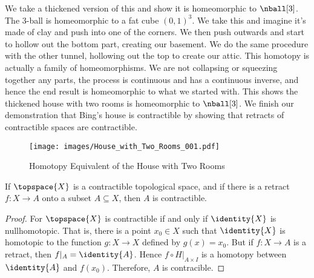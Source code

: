 \documentclass{book}                                                           %
\begin{document}
                We take a thickened version of this and show it is homeomorphic
                to $\nball[3]$. The 3-ball is homeomorphic to a fat cube
                $(0,1)^{3}$. We take this and imagine it's made of clay and push
                into one of the corners. We then push outwards and start to
                hollow out the bottom part, creating our basement. We do the
                same procedure with the other tunnel, hollowing out the top to
                create our attic. This homotopy is actually a family of
                homeomorphisms. We are not collapsing or squeezing together any
                parts, the process is continuous and has a continuous inverse,
                and hence the end result is homeomorphic to what we started
                with. This shows the thickened house with two rooms is
                homeomorphic to $\nball[3]$. We finish our demonstration that
                Bing's house is contractible by showing that retracts of
                contractible spaces are contractible.
                \begin{figure}
                    \centering
                    \captionsetup{type=figure}
                    \texttt{[image: images/House\_with\_Two\_Rooms\_001.pdf]}
                    \caption{Homotopy Equivalent of the House with Two Rooms}
                    \label{fig:House_with_Two_Rooms_001}
                \end{figure}
                \begin{theorem}
                    If $\topspace{X}$ is a contractible topological space, and
                    if there is a retract $f:X\rightarrow{A}$ onto a subset
                    $A\subseteq{X}$, then $A$ is contractible.
                \end{theorem}
                \begin{proof}
                    For $\topspace{X}$ is contractible if and only if
                    $\identity{X}$ is nullhomotopic. That is, there is a point
                    $x_{0}\in{X}$ such that $\identity{X}$ is homotopic to the
                    function $g:X\rightarrow{X}$ defined by $g(x)=x_{0}$. But if
                    $f:X\rightarrow{A}$ is a retract, then
                    $f|_{A}=\identity{A}$. Hence $f\circ{H}|_{A\times{I}}$ is a
                    homotopy between $\identity{A}$ and $f(x_{0})$. Therefore,
                    $A$ is contracible.
                \end{proof}
\end{document}
